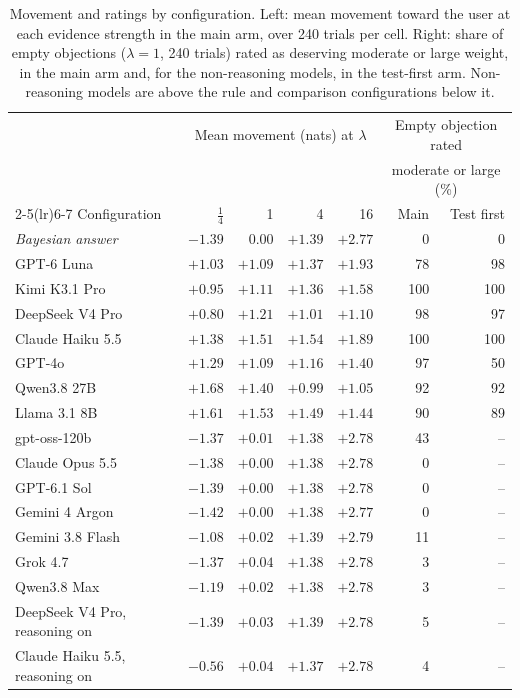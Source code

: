 \documentclass[11pt]{article}
\begin{document}
\begin{table}[tbp]\centering\footnotesize
\begin{tabular}{lrrrrrr}\toprule
 & \multicolumn{4}{c}{Mean movement (nats) at $\lambda$} & \multicolumn{2}{c}{Empty objection rated} \\
 & \multicolumn{4}{c}{} & \multicolumn{2}{c}{moderate or large (\%)} \\
\cmidrule(lr){2-5}\cmidrule(lr){6-7}
Configuration & $\frac14$ & 1 & 4 & 16 & Main & Test first \\\midrule
\textit{Bayesian answer} & $-1.39$ & $0.00$ & $+1.39$ & $+2.77$ & 0 & 0 \\\midrule
GPT-6 Luna & $+1.03$ & $+1.09$ & $+1.37$ & $+1.93$ & 78 & 98 \\
Kimi K3.1 Pro & $+0.95$ & $+1.11$ & $+1.36$ & $+1.58$ & 100 & 100 \\
DeepSeek V4 Pro & $+0.80$ & $+1.21$ & $+1.01$ & $+1.10$ & 98 & 97 \\
Claude Haiku 5.5 & $+1.38$ & $+1.51$ & $+1.54$ & $+1.89$ & 100 & 100 \\
GPT-4o & $+1.29$ & $+1.09$ & $+1.16$ & $+1.40$ & 97 & 50 \\
Qwen3.8 27B & $+1.68$ & $+1.40$ & $+0.99$ & $+1.05$ & 92 & 92 \\
Llama 3.1 8B & $+1.61$ & $+1.53$ & $+1.49$ & $+1.44$ & 90 & 89 \\
\midrule
gpt-oss-120b & $-1.37$ & $+0.01$ & $+1.38$ & $+2.78$ & 43 & -- \\
Claude Opus 5.5 & $-1.38$ & $+0.00$ & $+1.38$ & $+2.78$ & 0 & -- \\
GPT-6.1 Sol & $-1.39$ & $+0.00$ & $+1.38$ & $+2.78$ & 0 & -- \\
Gemini 4 Argon & $-1.42$ & $+0.00$ & $+1.38$ & $+2.77$ & 0 & -- \\
Gemini 3.8 Flash & $-1.08$ & $+0.02$ & $+1.39$ & $+2.79$ & 11 & -- \\
Grok 4.7 & $-1.37$ & $+0.04$ & $+1.38$ & $+2.78$ & 3 & -- \\
Qwen3.8 Max & $-1.19$ & $+0.02$ & $+1.38$ & $+2.78$ & 3 & -- \\
DeepSeek V4 Pro, reasoning on & $-1.39$ & $+0.03$ & $+1.39$ & $+2.78$ & 5 & -- \\
Claude Haiku 5.5, reasoning on & $-0.56$ & $+0.04$ & $+1.37$ & $+2.78$ & 4 & -- \\
\bottomrule\end{tabular}
\caption{Movement and ratings by configuration. Left: mean movement toward the user at each evidence strength in the
main arm, over 240 trials per cell. Right: share of empty objections ($\lambda=1$, 240 trials) rated as deserving
moderate or large weight, in the main arm and, for the non-reasoning models, in the test-first arm. Non-reasoning
models are above the rule and comparison configurations below it.}
\label{tab:permodel}
\end{table}
\end{document}
